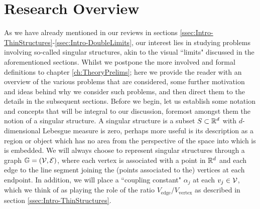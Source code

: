 \section{Research Overview} \label{sec:Intro-ProblemIntroduction}
As we have already mentioned in our reviews in sections \ref{ssec:Intro-ThinStructures}-\ref{ssec:Intro-DoubleLimits}, our interest lies in studying problems involving so-called singular structures, akin to the visual ``limits" discussed in the aforementioned sections.
Whilst we postpone the more involved and formal definitions to chapter \ref{ch:TheoryPrelims}; here we provide the reader with an overview of the various problems that are considered, some further motivation and ideas behind why we consider such problems, and then direct them to the details in the subsequent sections.
Before we begin, let us establish some notation and concepts that will be integral to our discussion, foremost amongst them the notion of a singular structure.
A singular structure is a subset $S\subset\mathbb{R}^d$ with $d$-dimensional Lebesgue measure is zero, perhaps more useful is its description as a region or object which has no area from the perspective of the space into which is is embedded.
We will always choose to represent singular structures through a graph $\mathbb{G}=\left( \mathcal{V},\mathcal{E} \right)$, where each vertex is associated with a point in $\mathbb{R}^d$ and each edge to the line segment joining the (points associated to the) vertices at each endpoint.
In addition, we will place a ``coupling constant" $\alpha_j$ at each $v_j\in\mathcal{V}$, which we think of as playing the role of the ratio $V_{\mathrm{edge}} / V_{\mathrm{vertex}}$ as described in section \ref{ssec:Intro-ThinStructures}.

